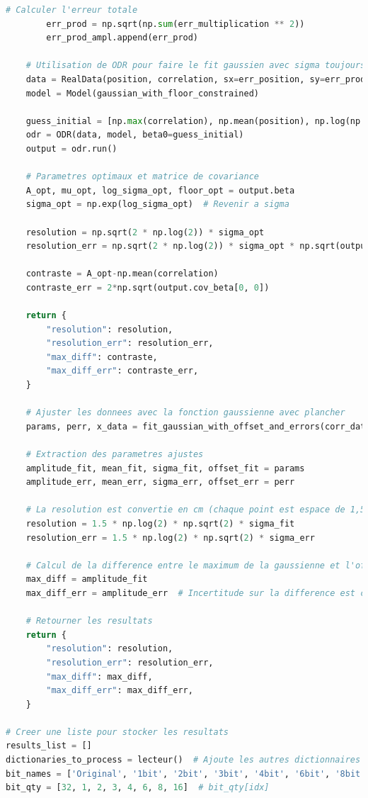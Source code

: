 \documentclass[11pt,letterpaper]{article}
\begin{document}
\begin{lstlisting}[language=python]
        # Calculer l'erreur totale
        err_prod = np.sqrt(np.sum(err_multiplication ** 2))
        err_prod_ampl.append(err_prod)

    # Utilisation de ODR pour faire le fit gaussien avec sigma toujours positif
    data = RealData(position, correlation, sx=err_position, sy=err_prod_ampl)
    model = Model(gaussian_with_floor_constrained)
    
    guess_initial = [np.max(correlation), np.mean(position), np.log(np.std(position)), np.mean(correlation)]
    odr = ODR(data, model, beta0=guess_initial)
    output = odr.run()

    # Parametres optimaux et matrice de covariance
    A_opt, mu_opt, log_sigma_opt, floor_opt = output.beta
    sigma_opt = np.exp(log_sigma_opt)  # Revenir a sigma

    resolution = np.sqrt(2 * np.log(2)) * sigma_opt
    resolution_err = np.sqrt(2 * np.log(2)) * sigma_opt * np.sqrt(output.cov_beta[2, 2])

    contraste = A_opt-np.mean(correlation)
    contraste_err = 2*np.sqrt(output.cov_beta[0, 0])
    
    return {
        "resolution": resolution,
        "resolution_err": resolution_err,
        "max_diff": contraste,
        "max_diff_err": contraste_err,
    }

    # Ajuster les donnees avec la fonction gaussienne avec plancher
    params, perr, x_data = fit_gaussian_with_offset_and_errors(corr_data, yerr)
    
    # Extraction des parametres ajustes
    amplitude_fit, mean_fit, sigma_fit, offset_fit = params
    amplitude_err, mean_err, sigma_err, offset_err = perr

    # La resolution est convertie en cm (chaque point est espace de 1,5cm)
    resolution = 1.5 * np.log(2) * np.sqrt(2) * sigma_fit
    resolution_err = 1.5 * np.log(2) * np.sqrt(2) * sigma_err  

    # Calcul de la difference entre le maximum de la gaussienne et l'offset
    max_diff = amplitude_fit
    max_diff_err = amplitude_err  # Incertitude sur la difference est celle de l'amplitude

    # Retourner les resultats
    return {
        "resolution": resolution,
        "resolution_err": resolution_err,
        "max_diff": max_diff,
        "max_diff_err": max_diff_err,
    }

# Creer une liste pour stocker les resultats
results_list = []
dictionaries_to_process = lecteur()  # Ajoute les autres dictionnaires ici
bit_names = ['Original', '1bit', '2bit', '3bit', '4bit', '6bit', '8bit', '16bit']
bit_qty = [32, 1, 2, 3, 4, 6, 8, 16]  # bit_qty[idx]


\end{lstlisting}
\end{document}
